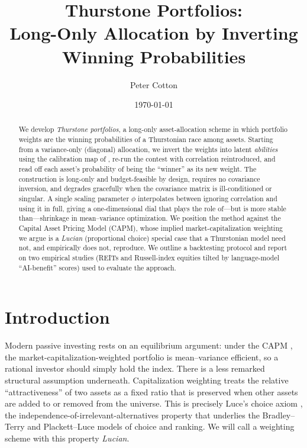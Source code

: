 \documentclass[11pt]{article}
\title{Thurstone Portfolios:\\
       Long-Only Allocation by Inverting Winning Probabilities}
\author{Peter Cotton}
\date{\today}
\begin{document}
\maketitle

\begin{abstract}
We develop \emph{Thurstone portfolios}, a long-only asset-allocation scheme in
which portfolio weights are the winning probabilities of a Thurstonian race
among assets. Starting from a variance-only (diagonal) allocation, we invert the
weights into latent \emph{abilities} using the calibration map of
\textcite{cotton2021}, re-run the contest with correlation reintroduced, and
read off each asset's probability of being the ``winner'' as its new weight. The
construction is long-only and budget-feasible by design, requires no covariance
inversion, and degrades gracefully when the covariance matrix is ill-conditioned
or singular. A single scaling parameter $\phi$ interpolates between ignoring
correlation and using it in full, giving a one-dimensional dial that plays the
role of---but is more stable than---shrinkage in mean--variance optimization. We
position the method against the Capital Asset Pricing Model (CAPM), whose
implied market-capitalization weighting we argue is a \emph{Lucian} (proportional
choice) special case that a Thurstonian model need not, and empirically does not,
reproduce. We outline a backtesting protocol and report on two empirical studies
(REITs and Russell-index equities tilted by language-model ``AI-benefit''
scores) used to evaluate the approach.
\end{abstract}

\section{Introduction}
\label{sec:intro}

Modern passive investing rests on an equilibrium argument: under the CAPM
\parencite{sharpe1964}, the market-capitalization-weighted portfolio is mean--variance
efficient, so a rational investor should simply hold the index. There is a less
remarked structural assumption underneath. Capitalization weighting treats the
relative ``attractiveness'' of two assets as a fixed ratio that is preserved
when other assets are added to or removed from the universe. This is precisely
Luce's choice axiom \parencite{luce1959}, the independence-of-irrelevant-alternatives
property that underlies the Bradley--Terry \parencite{bradleyterry1952} and
Plackett--Luce \parencite{plackett1975} models of choice and ranking. We will call a
weighting scheme with this property \emph{Lucian}.
\end{document}
